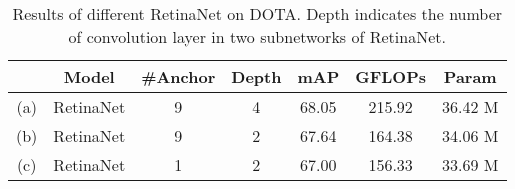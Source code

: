 \documentclass[10pt,journal,final]{IEEEtran}
\begin{document}
\begin{table}[!t]
  \caption{Results of different RetinaNet on DOTA. Depth indicates the number of convolution layer in two subnetworks of RetinaNet.}
  \vspace{-3mm}  
  \begin{center}
    \begin{tabular}{c|c|c|c|c|c|c} \hline
       & Model        &\#Anchor & Depth & mAP    &GFLOPs & Param   \\ \hline
    (a)& RetinaNet    &  9      & 4     & 68.05  &215.92 & 36.42 M \\
    (b)& RetinaNet    &  9      & 2     & 67.64  &164.38 & 34.06 M \\
    (c)& RetinaNet    &  1      & 2     & 67.00  &156.33 & 33.69 M \\ \hline
    \end{tabular}
\end{center}     \label{tab:retinenet}
    \vspace{-3mm}  
\end{table}

\begin{table*}[!t]
  \caption{Comparing Alignment Convolution (AlignConv) with other convolution methods. We compare our AlignConv with the standard convolution (Conv), Deformable Convolution (DeformConv) and Guided Anchoring Deformable Convolution (GA-DeformConv).}
  \vspace{-3mm}
  \centering
{}   \label{tab:conv_type}
  \vspace{-3mm}
\end{table*}
\end{document}
